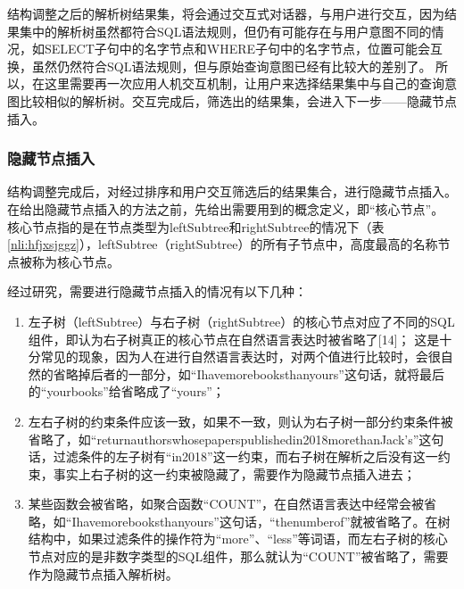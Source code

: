 结构调整之后的解析树结果集，将会通过交互式对话器，与用户进行交互，因为结果集中的解析树虽然都符合SQL语法规则，但仍有可能存在与用户意图不同的情况，如SELECT子句中的名字节点和WHERE子句中的名字节点，位置可能会互换，虽然仍然符合SQL语法规则，但与原始查询意图已经有比较大的差别了。
所以，在这里需要再一次应用人机交互机制，让用户来选择结果集中与自己的查询意图比较相似的解析树。交互完成后，筛选出的结果集，会进入下一步——隐藏节点插入。

\subsubsection{隐藏节点插入}

结构调整完成后，对经过排序和用户交互筛选后的结果集合，进行隐藏节点插入。
在给出隐藏节点插入的方法之前，先给出需要用到的概念定义，即“核心节点”。
核心节点指的是在节点类型为leftSubtree和rightSubtree的情况下（表\ref{nli:hfjxsjggz}），leftSubtree（rightSubtree）的所有子节点中，高度最高的名称节点被称为核心节点。

经过研究，需要进行隐藏节点插入的情况有以下几种：
\begin{enumerate}
    \item 左子树（leftSubtree）与右子树（rightSubtree）的核心节点对应了不同的SQL组件，即认为右子树真正的核心节点在自然语言表达时被省略了[14]；
    这是十分常见的现象，因为人在进行自然语言表达时，对两个值进行比较时，会很自然的省略掉后者的一部分，如“Ihavemorebooksthanyours”这句话，就将最后的“yourbooks”给省略成了“yours”；
    \item 左右子树的约束条件应该一致，如果不一致，则认为右子树一部分约束条件被省略了，如“returnauthorswhosepaperspublishedin2018morethanJack’s”这句话，过滤条件的左子树有“in2018”这一约束，而右子树在解析之后没有这一约束，事实上右子树的这一约束被隐藏了，需要作为隐藏节点插入进去；
    \item 某些函数会被省略，如聚合函数“COUNT”，在自然语言表达中经常会被省略，如“Ihavemorebooksthanyours”这句话，“thenumberof”就被省略了。在树结构中，如果过滤条件的操作符为“more”、“less”等词语，而左右子树的核心节点对应的是非数字类型的SQL组件，那么就认为“COUNT”被省略了，需要作为隐藏节点插入解析树。
\end{enumerate}

